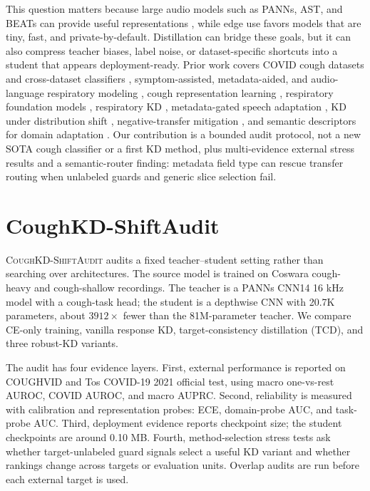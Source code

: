 \documentclass{article}
\newcommand{\method}{\textsc{CoughKD-ShiftAudit}}
\begin{document}
This question matters because large audio models such as PANNs, AST, and BEATs can provide useful representations \cite{kong2020panns,gong2021ast,chen2023beats}, while edge use favors models that are tiny, fast, and private-by-default. Distillation can bridge these goals, but it can also compress teacher biases, label noise, or dataset-specific shortcuts into a student that appears deployment-ready. Prior work covers COVID cough datasets and cross-dataset classifiers \cite{saravanan2026dndt}, symptom-assisted, metadata-aided, and audio-language respiratory modeling \cite{lin2025sympcoughnet,yang2026deviceinvariant,kim2024bts,wang2026acula,siam2026respiramfm,vincent2026coughsense}, cough representation learning \cite{luong2025coughvit}, respiratory foundation models \cite{opera2024}, respiratory KD \cite{toikkanen2025respiratorykd}, metadata-gated speech adaptation \cite{mehralian2026gloria}, KD under distribution shift \cite{shiftkd2025}, negative-transfer mitigation \cite{zhang2022negativetransfer}, and semantic descriptors for domain adaptation \cite{yang2015unified}. Our contribution is a bounded audit protocol, not a new SOTA cough classifier or a first KD method, plus multi-evidence external stress results and a semantic-router finding: metadata field type can rescue transfer routing when unlabeled guards and generic slice selection fail.

\section{CoughKD-ShiftAudit}
\method{} audits a fixed teacher--student setting rather than searching over architectures. The source model is trained on Coswara cough-heavy and cough-shallow recordings. The teacher is a PANNs CNN14 16 kHz model with a cough-task head; the student is a depthwise CNN with 20.7K parameters, about $3912\times$ fewer than the 81M-parameter teacher. We compare CE-only training, vanilla response KD, target-consistency distillation (TCD), and three robust-KD variants.

The audit has four evidence layers. First, external performance is reported on COUGHVID and Tos COVID-19 2021 official test, using macro one-vs-rest AUROC, COVID AUROC, and macro AUPRC. Second, reliability is measured with calibration and representation probes: ECE, domain-probe AUC, and task-probe AUC. Third, deployment evidence reports checkpoint size; the student checkpoints are around 0.10 MB. Fourth, method-selection stress tests ask whether target-unlabeled guard signals select a useful KD variant and whether rankings change across targets or evaluation units. Overlap audits are run before each external target is used.
\end{document}
